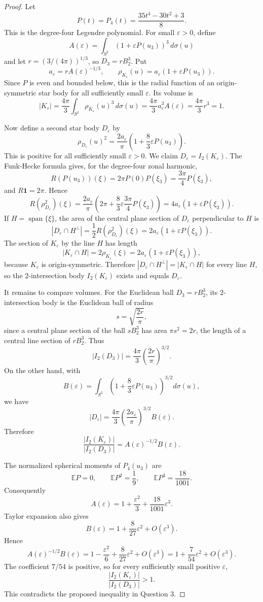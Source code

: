 \documentclass[11pt]{amsart}
\theoremstyle{remark}
\newcommand{\eps}{\varepsilon}
\newcommand{\avg}{\mathbb E}
\newcommand{\one}{\mathbf 1}
\begin{document}
\begin{proof}
Let
\[
        P(t)=P_4(t)=\frac{35t^4-30t^2+3}{8}.
\]
This is the degree-four Legendre polynomial.  For small \(\eps>0\), define
\[
        A(\eps)=\int_{S^2} (1+\eps P(u_3))^3\,d\sigma(u)
\]
and let \(r=(3/(4\pi))^{1/3}\), so \(D_3=rB_2^3\).  Put
\[
        a_\eps=rA(\eps)^{-1/3},\qquad
        \rho_{K_\eps}(u)=a_\eps(1+\eps P(u_3)).
\]
Since \(P\) is even and bounded below, this is the radial function of an
origin-symmetric star body for all sufficiently small \(\eps\).  Its volume is
\[
        |K_\eps|
        =\frac{4\pi}{3}\int_{S^2}\rho_{K_\eps}(u)^3\,d\sigma(u)
        =\frac{4\pi}{3}a_\eps^3 A(\eps)
        =\frac{4\pi}{3}r^3=1.
\]

Now define a second star body \(D_\eps\) by
\[
        \rho_{D_\eps}(u)^2
        =\frac{2a_\eps}{\pi}\left(1+\frac{8}{3}\eps P(u_3)\right).
\]
This is positive for all sufficiently small \(\eps>0\).  We claim
\(D_\eps=I_2(K_\eps)\).  The Funk-Hecke formula gives, for the degree-four
zonal harmonic,
\[
        R(P(u_3))(\xi)=2\pi P(0)P(\xi_3)=\frac{3\pi}{4}P(\xi_3),
\]
and \(R\one=2\pi\).  Hence
\[
        R(\rho_{D_\eps}^2)(\xi)
        =\frac{2a_\eps}{\pi}\left(2\pi+
          \frac{8}{3}\eps\frac{3\pi}{4}P(\xi_3)\right)
        =4a_\eps(1+\eps P(\xi_3)).
\]
If \(H=\operatorname{span}\{\xi\}\), the area of the central plane section of
\(D_\eps\) perpendicular to \(H\) is
\[
        |D_\eps\cap H^\perp|
        =\frac12 R(\rho_{D_\eps}^2)(\xi)
        =2a_\eps(1+\eps P(\xi_3)).
\]
The section of \(K_\eps\) by the line \(H\) has length
\[
        |K_\eps\cap H|=2\rho_{K_\eps}(\xi)
        =2a_\eps(1+\eps P(\xi_3)),
\]
because \(K_\eps\) is origin-symmetric.  Therefore
\(|D_\eps\cap H^\perp|=|K_\eps\cap H|\) for every line \(H\), so the
\(2\)-intersection body \(I_2(K_\eps)\) exists and equals \(D_\eps\).

It remains to compare volumes.  For the Euclidean ball \(D_3=rB_2^3\), its
\(2\)-intersection body is the Euclidean ball of radius
\[
        s=\sqrt{\frac{2r}{\pi}},
\]
since a central plane section of the ball \(sB_2^3\) has area \(\pi s^2=2r\),
the length of a central line section of \(rB_2^3\).  Thus
\[
        |I_2(D_3)|=\frac{4\pi}{3}\left(\frac{2r}{\pi}\right)^{3/2}.
\]
On the other hand, with
\[
        B(\eps)=\int_{S^2}\left(1+\frac{8}{3}\eps P(u_3)\right)^{3/2}
                 d\sigma(u),
\]
we have
\[
        |D_\eps|
        =\frac{4\pi}{3}\left(\frac{2a_\eps}{\pi}\right)^{3/2}B(\eps).
\]
Therefore
\[
        \frac{|I_2(K_\eps)|}{|I_2(D_3)|}
        =A(\eps)^{-1/2}B(\eps).
\]

The normalized spherical moments of \(P_4(u_3)\) are
\[
        \avg P=0,\qquad \avg P^2=\frac19,\qquad \avg P^3=\frac{18}{1001}.
\]
Consequently
\[
        A(\eps)=1+\frac{\eps^2}{3}+\frac{18}{1001}\eps^3.
\]
Taylor expansion also gives
\[
        B(\eps)
        =1+\frac{8}{27}\eps^2+O(\eps^3).
\]
Hence
\[
        A(\eps)^{-1/2}B(\eps)
        =1-\frac{\eps^2}{6}+\frac{8}{27}\eps^2+O(\eps^3)
        =1+\frac{7}{54}\eps^2+O(\eps^3).
\]
The coefficient \(7/54\) is positive, so for every sufficiently small
positive \(\eps\),
\[
        \frac{|I_2(K_\eps)|}{|I_2(D_3)|}>1.
\]
This contradicts the proposed inequality in Question 3.
\end{proof}
\end{document}
